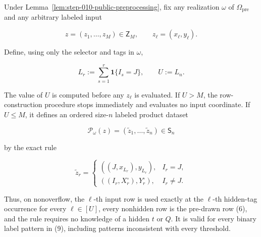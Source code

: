 \begin{proposition}\label{prop:step-010-row-construction}
Under Lemma~\ref{lem:step-010-public-preprocessing}, fix any realization
\(\omega\) of \(\Omega_{\mathrm{pre}}\) and any arbitrary labeled input

\[
  z=(z_1,\ldots,z_M)\in\mathsf Z_M,
  \qquad z_\ell=(x_\ell,y_\ell).
\tag{9}
\]

Define, using only the selector and tags in \(\omega\),

\[
  L_r:=\sum_{s=1}^r\mathbf1\{I_s=J\},
  \qquad
  U:=L_n.
\tag{10}
\]

The value of \(U\) is computed before any \(z_\ell\) is evaluated. If
\(U>M\), the row-construction procedure stops immediately and evaluates no
input coordinate. If \(U\le M\), it defines an ordered size-\(n\) labeled
product dataset

\[
  \mathcal P_\omega(z)
  =(\widetilde z_1,\ldots,\widetilde z_n)\in\mathsf S_n
\tag{11}
\]

by the exact rule

\[
  \widetilde z_r=
  \begin{cases}
    ((J,x_{L_r}),y_{L_r}), & I_r=J,\\[2mm]
    ((I_r,X_r^\circ),Y_r^\circ), & I_r\ne J.
  \end{cases}
\tag{12}
\]

Thus, on nonoverflow, the \(\ell\)-th input row is used exactly at the
\(\ell\)-th hidden-tag occurrence for every \(\ell\in[U]\), every
nonhidden row is the pre-drawn row (6), and the rule requires no knowledge
of a hidden \(t\) or \(Q\). It is valid for every binary label pattern in
(9), including patterns inconsistent with every threshold.
\end{proposition}

